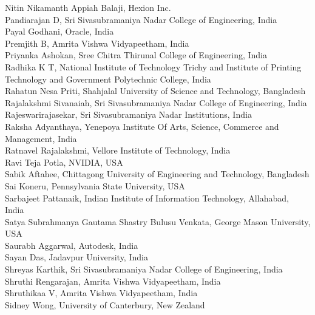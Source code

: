 \documentclass[11pt,oneside]{book}
\begin{document}
\begin{description}
              Nitin Nikamanth Appiah Balaji, Hexion Inc.\\
              Pandiarajan D, Sri Sivasubramaniya Nadar College of Engineering, India\\
              Payal Godhani, Oracle, India\\
              Premjith B, Amrita Vishwa Vidyapeetham, India\\
              Priyanka Ashokan, Sree Chitra Thirunal College of Engineering, India\\
              Radhika K T, National Institute of Technology Trichy and Institute of Printing Technology and Government Polytechnic College, India\\
              Rahatun Nesa Priti, Shahjalal University of Science and Technology, Bangladesh\\
              Rajalakshmi Sivanaiah, Sri Sivasubramaniya Nadar College of Engineering, India\\
              Rajeswarirajasekar, Sri Sivasubramaniya Nadar Institutions, India\\
              Raksha Adyanthaya, Yenepoya Institute Of Arts, Science, Commerce and Management, India\\
              Ratnavel Rajalakshmi, Vellore Institute of Technology, India\\
              Ravi Teja Potla, NVIDIA, USA\\
              Sabik Aftahee, Chittagong University of Engineering and Technology, Bangladesh\\
              Sai Koneru, Pennsylvania State University, USA\\
              Sarbajeet Pattanaik, Indian Institute of Information Technology, Allahabad, India\\
              Satya Subrahmanya Gautama Shastry Bulusu Venkata, George Mason University, USA\\
              Saurabh Aggarwal, Autodesk, India\\
              Sayan Das, Jadavpur University, India\\
              Shreyas Karthik, Sri Sivasubramaniya Nadar College of Engineering, India\\
              Shruthi Rengarajan, Amrita Vishwa Vidyapeetham, India\\
              Shruthikaa V, Amrita Vishwa Vidyapeetham, India\\
              Sidney Wong, University of Canterbury, New Zealand\\

\end{description}
\end{document}
